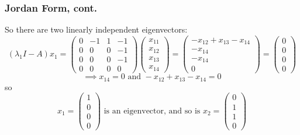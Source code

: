 \documentclass{beamer}
\begin{document}
\begin{frame}\frametitle{Jordan Form, cont.}
	So there are two linearly independent eigenvectors:
	\[ 
		(\lambda_1I-A)x_1 
			= \begin{pmatrix}
	    		0 & -1 & 1 & -1\\
	    		0 & 0 & 0 & -1\\
	    		0 & 0 & 0 & -1\\
	    		0 & 0 & 0 & 0
	  		  \end{pmatrix}
	  		  \begin{pmatrix}
	    			x_{11}\\x_{12}\\x_{13}\\x_{14}
	  		  \end{pmatrix}
	  		= \begin{pmatrix}
	    		-x_{12} + x_{13} - x_{14}\\-x_{14}\\-x_{14}\\0
	  		  \end{pmatrix}
	  		= \begin{pmatrix}
	    		0\\0\\0\\0
	  		  \end{pmatrix}
	\]
	\[ 
		\implies x_{14} = 0 \text{ and } -x_{12}+x_{13}-x_{14} = 0 
	\]
	so
	\[ 	
		x_1 = \begin{pmatrix}
	    		1\\0\\0\\0
	  		  \end{pmatrix} 
	  	\text{ is an eigenvector, and so is } 
	  	x_2 = \begin{pmatrix}
	    		0\\1\\1\\0
	  		  \end{pmatrix}
	\]	
\end{frame}
\end{document}
